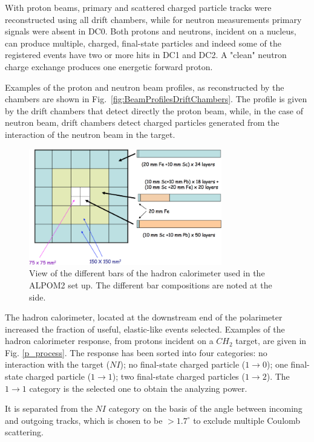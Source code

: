 \documentclass[twocolumn,epjc3]{svjour3}
\begin{document}
With proton beams, primary and scattered charged particle tracks were reconstructed using all drift chambers, while for neutron measurements primary signals were absent in DC0. Both protons and neutrons, incident on a nucleus, can produce multiple, charged, final-state particles and indeed some of the registered events have two or more hits in DC1 and DC2. A "clean" neutron charge exchange produces one energetic forward proton.

Examples of the proton and neutron beam profiles, as reconstructed by the chambers are shown in Fig.~\ref{fig:BeamProfilesDriftChambers}. The profile is given by the drift chambers that detect directly the proton beam, while, in the case of neutron beam, drift chambers detect charged particles generated from the interaction of the neutron beam in the target.

\begin{figure}
  \centering
  \includegraphics[width=0.75\textwidth]{fig10_HadCalDesign.png}
  \caption{View of the different bars of the hadron calorimeter used in the ALPOM2 set up. The different bar compositions are noted at the side.}
  \label{fig:HadCalDesign}
\end{figure}

The hadron calorimeter, located at the downstream end of the polarimeter increased the fraction of useful, elastic-like events selected. Examples of the hadron calorimeter response, from protons incident on a $CH_2$ target, are given in Fig. \ref{p_process}. The response has been sorted into four categories: no interaction with the target ($NI$); no final-state charged particle ($1 \to 0$); one final-state charged particle ($1 \to 1$); two final-state charged particles ($1 \to 2$). The $1 \to 1$ category is the selected one to obtain the analyzing power.

It is separated from the $NI$ category on the basis of the angle between incoming and outgoing tracks, which is chosen to be $>1.7^\circ$ to exclude multiple Coulomb scattering.
\end{document}
